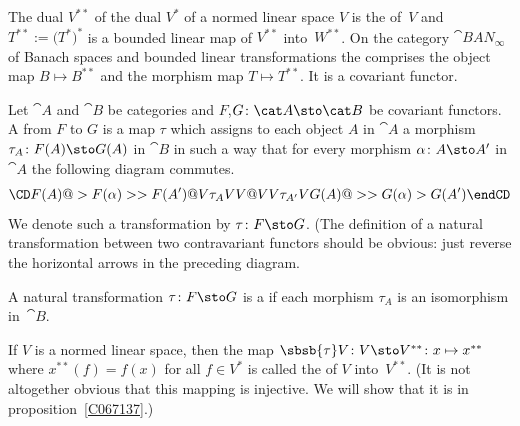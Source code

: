\begin{exam}\label{C057717}
The dual $V^{**}$ of the dual $V^*$ of a normed linear space $V$ is the  of~$V$
and $T^{**} := \bigl(T^*\bigr)^*$ is a bounded linear map of $V^{**}$ into~$W^{**}$.  On the category
$\cat{BAN_{\boldsymbol\infty}}$ of Banach spaces and bounded linear transformations the
 comprises the object map $B \mapsto B^{**}$ and the morphism map $T \mapsto T^{**}$.
It is a covariant functor.
\end{exam}

\begin{defn}\label{defn_nat_transf} Let $\cat A$ and $\cat B$ be categories and $F$,$G \colon \cat A \sto \cat B$ be
covariant functors.  A
 from $F$ to $G$ is a map $\tau$ which assigns to each object
$A$ in $\cat A$ a morphism $\tau_A \colon F(A) \sto G(A)$ in $\cat B$ in such a way that
for every morphism $\alpha \colon A \sto A'$ in $\cat A$ the following diagram commutes.
   \[ \CD
      F(A) @>  F(\alpha)>>  F(A')  \\
         @V\tau_AVV                @VV\tau_{A'}V  \\
      G(A) @>> G(\alpha)>  G(A')
   \endCD \]
We denote such a transformation by $\tau \colon F \sto G$. (The definition of a natural
transformation between two contravariant functors should be obvious: just reverse the
horizontal arrows in the preceding diagram.

A natural transformation $\tau \colon  F \sto G$ is a
 if each morphism $\tau_A$ is an isomorphism in~$\cat B$.
\end{defn}

\begin{defn}\label{defn_nat_embed} If $V$ is a normed linear space, then the map $\sbsb{\tau}V \colon V \sto V^{**} \colon x
\mapsto x^{**}$ where $x^{**}(f) = f(x)$ for all $f \in V^*$ is called the
 of $V$ into~$V^{**}$. (It is not altogether obvious that this mapping is
injective. We will show that it is in proposition~\ref{C067137}.)
\end{defn}

